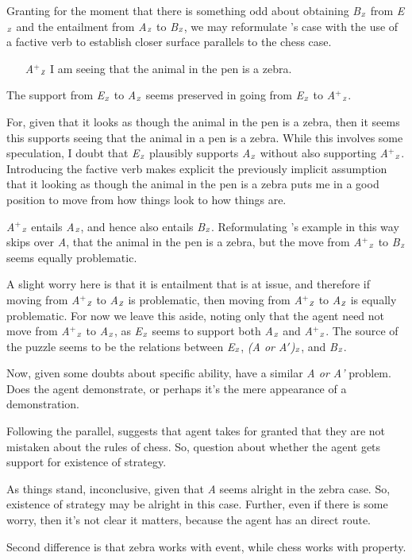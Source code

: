 \documentclass[10pt]{article}
\newcommand{\tri}[2]{\emph{#2}\(_{\text{\tiny\emph #1}}\)}
\begin{document}
\begin{note}[Classic]
  Granting for the moment that there is something odd about obtaining \tri{Z}{B} from \tri{Z}{E} and the entailment from \tri{Z}{A} to \tri{Z}{B}, we may reformulate \citeauthor{Dretske:2005vy}'s case with the use of a factive verb to establish closer surface parallels to the chess case.
  \begin{enumerate}
  \item[\tri{Z}{A\(^{+}\)}] I am seeing that the animal in the pen is a zebra.
  \end{enumerate}
  The support from \tri{Z}{E} to \tri{Z}{A} seems preserved in going from \tri{Z}{E} to \tri{Z}{A\(^{+}\)}.

  For, given that it looks as though the animal in the pen is a zebra, then it seems this supports seeing that the animal in a pen is a zebra.
  While this involves some speculation, I doubt that \tri{Z}{E} plausibly supports \tri{Z}{A} without also supporting \tri{Z}{A\(^{+}\)}.
  Introducing the factive verb makes explicit the previously implicit assumption that it looking as though the animal in the pen is a zebra puts me in a good position to move from how things look to how things are.

  \tri{Z}{A\(^{+}\)} entails \tri{Z}{A}, and hence also entails \tri{Z}{B}.
  Reformulating \citeauthor{Dretske:2005vy}'s example in this way skips over \emph{A}, that the animal in the pen is a zebra, but the move from \tri{Z}{A\(^{+}\)} to \tri{Z}{B} seems equally problematic.

  A slight worry here is that it is entailment that is at issue, and therefore if moving from \tri{Z}{A\(^{+}\)} to \tri{Z}{A} is problematic, then moving from \tri{Z}{A\(^{+}\)} to \tri{Z}{A} is equally problematic.
  For now we leave this aside, noting only that the agent need not move from \tri{Z}{A\(^{+}\)} to \tri{Z}{A}, as \tri{Z}{E} seems to support both \tri{Z}{A} and \tri{Z}{A\(^{+}\)}.
  The source of the puzzle seems to be the relations between \tri{Z}{E}, \tri{Z}{(A or A\('\))}, and \tri{Z}{B}.
\end{note}

\begin{note}
  Now, given some doubts about specific ability, have a similar \emph{A or A'} problem.
  Does the agent demonstrate, or perhaps it's the mere appearance of a demonstration.

  Following the parallel, suggests that agent takes for granted that they are not mistaken about the rules of chess.
  So, question about whether the agent gets support for existence of strategy.

  As things stand, inconclusive, given that \emph{A} seems alright in the zebra case.
  So, existence of strategy may be alright in this case.
  Further, even if there is some worry, then it's not clear it matters, because the agent has an direct route.

  Second difference is that zebra works with event, while chess works with property.
\end{note}
\end{document}

